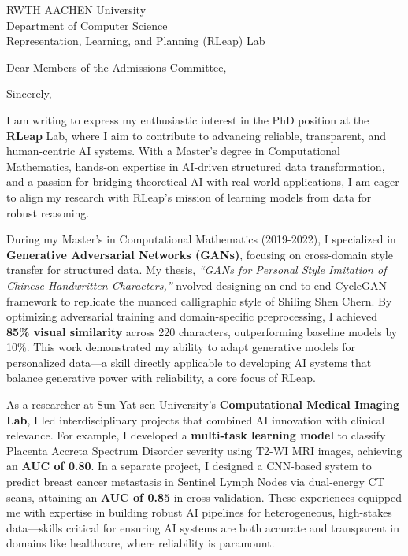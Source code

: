 \documentclass[11pt,a4paper, final]{moderncv}
\begin{document}
{RWTH AACHEN University\\
Department of Computer Science\\
Representation, Learning, and Planning (RLeap) Lab
}
\date{\today}
\opening{Dear Members of the Admissions Committee,}
\closing{Sincerely,}
\makelettertitle
\thispagestyle{empty}
\pagestyle{empty}
I am writing to express my enthusiastic interest in the PhD position at the \textbf{RLeap} Lab, 
where I aim to contribute to advancing reliable, transparent, and human-centric AI systems. 
With a Master's degree in Computational Mathematics, 
hands-on expertise in AI-driven structured data transformation, 
and a passion for bridging theoretical AI with real-world applications, 
I am eager to align my research with RLeap's mission of learning models from data for robust reasoning.

During my Master's in Computational Mathematics (2019-2022), 
I specialized in \textbf{Generative Adversarial Networks (GANs)}, 
focusing on cross-domain style transfer for structured data. 
My thesis, \emph{``GANs for Personal Style Imitation of Chinese Handwritten Characters,''} 
nvolved designing an end-to-end CycleGAN framework to replicate the nuanced calligraphic style of Shiling Shen Chern. 
By optimizing adversarial training and domain-specific preprocessing, 
I achieved \textbf{85\% visual similarity} across 220 characters, outperforming baseline models by 10\%. 
This work demonstrated my ability to adapt generative models for personalized data—a skill directly applicable 
to developing AI systems that balance generative power with reliability, a core focus of RLeap.

As a researcher at Sun Yat-sen University's \textbf{Computational Medical Imaging Lab}, 
I led interdisciplinary projects that combined AI innovation with clinical relevance. 
For example, I developed a \textbf{multi-task learning model} to 
classify Placenta Accreta Spectrum Disorder severity using T2-WI MRI images, achieving an \textbf{AUC of 0.80}. 
In a separate project, 
I designed a CNN-based system to predict breast cancer metastasis in Sentinel Lymph Nodes via dual-energy CT scans, 
attaining an \textbf{AUC of 0.85} in cross-validation. 
These experiences equipped me with expertise in building robust AI pipelines for 
heterogeneous, high-stakes data—skills critical for ensuring AI systems are both accurate and transparent in domains like healthcare, where reliability is paramount.
\end{document}
